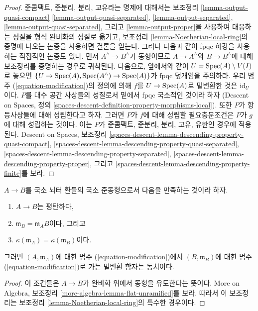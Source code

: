 \begin{proof}
준콤팩트, 준분리, 분리, 고유라는 명제에 대해서는 보조정리
\ref{lemma-output-quasi-compact}
\ref{lemma-output-quasi-separated},
\ref{lemma-output-separated},
\ref{lemma-output-quasi-separated}, 그리고
\ref{lemma-output-proper}을 사용하여 대응하는 성질을
형식 완비화의 성질로 옮기고, 보조정리
\ref{lemma-Noetherian-local-ring}의 증명에 나오는 논증을 사용하면 결론을 얻는다.
그러나 다음과 같이 fpqc 하강을 사용하는 직접적인 논증도 있다.
먼저 $A^\wedge  \to B^\wedge$가 동형이므로
$A \to A^\wedge$와 $B \to B^\wedge$에 대해 보조정리를 증명하는 경우로 귀착된다.
다음으로, 앞에서와 같이 $U = \mathop{\mathrm{Spec}}(A) \setminus V(I)$로 놓으면
$\{U \to \mathop{\mathrm{Spec}}(A), \mathop{\mathrm{Spec}}(A^\wedge) \to \mathop{\mathrm{Spec}}(A)\}$가 fpqc 덮개임을 주의하라.
우리 범주 (\ref{equation-modification})의 정의에 의해
$f$를 $U \to \mathop{\mathrm{Spec}}(A)$로 밑변환한 것은 $\text{id}_U$이다.
$P$를 대수 공간 사상들의 성질로서 밑에서 fpqc 국소적인 것이라 하자
(Descent on Spaces, 정의
\ref{spaces-descent-definition-property-morphisms-local}).
또한 $P$가 항등사상들에 대해 성립한다고 하자.
그러면 $P$가 $f$에 대해 성립할 필요충분조건은
$P$가 $g$에 대해 성립하는 것이다. 이는 $P$가
준콤팩트, 준분리, 분리, 고유, 유한인 경우에 적용된다.
Descent on Spaces, 보조정리
\ref{spaces-descent-lemma-descending-property-quasi-compact},
\ref{spaces-descent-lemma-descending-property-quasi-separated},
\ref{spaces-descent-lemma-descending-property-separated},
\ref{spaces-descent-lemma-descending-property-proper}, 그리고
\ref{spaces-descent-lemma-descending-property-finite}를 보라.
\end{proof}

\begin{lemma}
\label{lemma-equivalence-to-completion}
$A \to B$를 국소 뇌터 환들의 국소 준동형으로서 다음을 만족하는 것이라 하자.
\begin{enumerate}
\item $A \to B$는 평탄하다,
\item $\mathfrak m_B = \mathfrak m_A B$이다, 그리고
\item $\kappa(\mathfrak m_A) = \kappa(\mathfrak m_B)$이다.
\end{enumerate}
그러면 $(A, \mathfrak m_A)$에 대한 범주
(\ref{equation-modification})에서 $(B, \mathfrak m_B)$에 대한 범주
(\ref{equation-modification})로 가는 밑변환 함자는 동치이다.
\end{lemma}

\begin{proof}
이 조건들은 $A \to B$가 완비화 위에서 동형을 유도한다는 뜻이다.
More on Algebra, 보조정리 \ref{more-algebra-lemma-flat-unramified}를 보라.
따라서 이 보조정리는 보조정리 \ref{lemma-Noetherian-local-ring}의 특수한 경우이다.
\end{proof}

